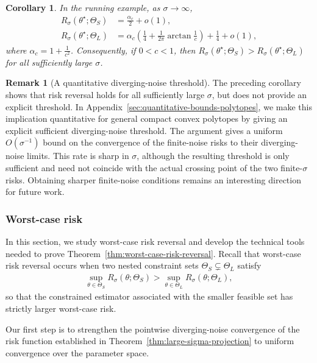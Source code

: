 \documentclass[11pt]{article}
\theoremstyle{plain}
\newtheorem{corollary}[theorem]{Corollary}
\theoremstyle{definition}
\newtheorem*{remark}{Remark}
\newcommand{\inparen}[1]{\left(#1\right)}             %
\begin{document}
\begin{corollary}\label{cor:DivergingNoiseThetaSLRisks}
In the running example, as $\sigma \to \infty$,
\begin{align*}
R_\sigma(\theta^\star; \Theta_S)
&=
\frac{\alpha_c}{2}
+ o(1), \\ 
R_\sigma(\theta^\star; \Theta_L)
&=
\alpha_c \inparen{\frac14 + \frac{1}{2\pi} \arctan \frac1c } + \frac14
+ o(1),
\end{align*}
where $\alpha_c = 1+\frac{1}{c^2}$. Consequently, if $0<c<1$, then $R_\sigma(\theta^\star; \Theta_S)
>
R_\sigma(\theta^\star; \Theta_L)$ for all sufficiently large $\sigma$.
\end{corollary}


\begin{remark}[A quantitative diverging-noise threshold]
The preceding corollary shows that risk reversal holds for all sufficiently
large $\sigma$, but does not provide an explicit threshold. In
Appendix~\ref{sec:quantitative-bounds-polytopes}, we make this implication quantitative for general compact convex polytopes by giving an explicit sufficient
diverging-noise threshold. The argument gives a uniform $O(\sigma^{-1})$ bound on the convergence of the finite-noise risks to their diverging-noise limits. This rate is sharp in $\sigma$, although the resulting threshold is
only sufficient and need not coincide with the actual crossing point of the two
finite-$\sigma$ risks. Obtaining sharper finite-noise conditions remains an interesting direction for future work.
\end{remark}



\subsubsection{Worst-case risk}\label{sec:sup-risk}
In this section, we study worst-case risk reversal and develop the technical tools needed to prove Theorem~\ref{thm:worst-case-risk-reversal}. Recall that worst-case risk reversal occurs when two nested constraint sets $\Theta_S \subsetneq \Theta_L$ satisfy
\begin{align*}
    \sup_{\theta \in \Theta_S} R_\sigma(\theta; \Theta_S)
    >
    \sup_{\theta \in \Theta_L} R_\sigma(\theta; \Theta_L),
\end{align*}
so that the constrained estimator associated with the smaller feasible set has strictly larger worst-case risk.

Our first step is to strengthen the pointwise diverging-noise convergence of the risk function established in Theorem~\ref{thm:large-sigma-projection} to uniform convergence over the parameter space.
\end{document}
